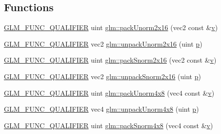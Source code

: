 \subsection*{Functions}
\begin{DoxyCompactItemize}
\item 
\hyperlink{setup_8hpp_a33fdea6f91c5f834105f7415e2a64407}{G\+L\+M\+\_\+\+F\+U\+N\+C\+\_\+\+Q\+U\+A\+L\+I\+F\+I\+ER} uint \hyperlink{group__core__func__packing_ga0e2d107039fe608a209497af867b85fb}{glm\+::pack\+Unorm2x16} (vec2 const \&\hyperlink{_s_d_l__opengl_8h_a10a82eabcb59d2fcd74acee063775f90}{v})
\item 
\hyperlink{setup_8hpp_a33fdea6f91c5f834105f7415e2a64407}{G\+L\+M\+\_\+\+F\+U\+N\+C\+\_\+\+Q\+U\+A\+L\+I\+F\+I\+ER} vec2 \hyperlink{group__core__func__packing_ga1f66188e5d65afeb9ffba1ad971e4007}{glm\+::unpack\+Unorm2x16} (uint \hyperlink{_s_d_l__opengl__glext_8h_aa5367c14d90f462230c2611b81b41d23}{p})
\item 
\hyperlink{setup_8hpp_a33fdea6f91c5f834105f7415e2a64407}{G\+L\+M\+\_\+\+F\+U\+N\+C\+\_\+\+Q\+U\+A\+L\+I\+F\+I\+ER} uint \hyperlink{group__core__func__packing_ga977ab172da5494e5ac63e952afacfbe2}{glm\+::pack\+Snorm2x16} (vec2 const \&\hyperlink{_s_d_l__opengl_8h_a10a82eabcb59d2fcd74acee063775f90}{v})
\item 
\hyperlink{setup_8hpp_a33fdea6f91c5f834105f7415e2a64407}{G\+L\+M\+\_\+\+F\+U\+N\+C\+\_\+\+Q\+U\+A\+L\+I\+F\+I\+ER} vec2 \hyperlink{group__core__func__packing_gacd8f8971a3fe28418be0d0fa1f786b38}{glm\+::unpack\+Snorm2x16} (uint \hyperlink{_s_d_l__opengl__glext_8h_aa5367c14d90f462230c2611b81b41d23}{p})
\item 
\hyperlink{setup_8hpp_a33fdea6f91c5f834105f7415e2a64407}{G\+L\+M\+\_\+\+F\+U\+N\+C\+\_\+\+Q\+U\+A\+L\+I\+F\+I\+ER} uint \hyperlink{group__core__func__packing_gaf7d2f7341a9eeb4a436929d6f9ad08f2}{glm\+::pack\+Unorm4x8} (vec4 const \&\hyperlink{_s_d_l__opengl_8h_a10a82eabcb59d2fcd74acee063775f90}{v})
\item 
\hyperlink{setup_8hpp_a33fdea6f91c5f834105f7415e2a64407}{G\+L\+M\+\_\+\+F\+U\+N\+C\+\_\+\+Q\+U\+A\+L\+I\+F\+I\+ER} vec4 \hyperlink{group__core__func__packing_ga7f903259150b67e9466f5f8edffcd197}{glm\+::unpack\+Unorm4x8} (uint \hyperlink{_s_d_l__opengl__glext_8h_aa5367c14d90f462230c2611b81b41d23}{p})
\item 
\hyperlink{setup_8hpp_a33fdea6f91c5f834105f7415e2a64407}{G\+L\+M\+\_\+\+F\+U\+N\+C\+\_\+\+Q\+U\+A\+L\+I\+F\+I\+ER} uint \hyperlink{group__core__func__packing_ga85e8f17627516445026ab7a9c2e3531a}{glm\+::pack\+Snorm4x8} (vec4 const \&\hyperlink{_s_d_l__opengl_8h_a10a82eabcb59d2fcd74acee063775f90}{v})

\end{DoxyCompactItemize}
